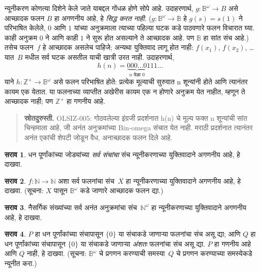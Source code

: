 \documentclass[11pt,a4paper,openany]{book}
\theoremstyle{definition}
\newtheorem{prob}{सराव}[chapter]
\newenvironment{explain}{}{}
\newcommand{\Nat}{\mathbb{N}}
\newcommand{\PosInt}{\mathbb{Z}^{+}}
\newcommand{\Bin}{\mathbb{B}}
\begin{document}
\begin{explain}
न्यूनीकरण कोणत्या दिशेने केले जाते याबद्दल गोंधळ होणे सोपे आहे.
उदाहरणार्थ, $g \colon \Bin^\omega \to B$ असे आच्छादक फलन
$B$ हा अगणनीय आहे, हे \emph{सिद्ध करत नाही}. ($g
\colon \Bin^\omega \to \Bin$ हे $g(s) = s(1)$ ने परिभाषित केलेले,
$0$ आणि $1$ यांच्या अनुक्रमाला त्याच्या पहिल्या घटक कडे
पाठवणारे फलन विचारात घ्या. काही अनुक्रम $0$ ने आणि काही $1$ ने सुरू
होत असल्याने ते आच्छादक आहे. पण $\Bin$ हा सांत संच आहे.)
तसेच फलन~$f$ हे आच्छादक असलेच पाहिजे; अन्यथा युक्तिवाद लागू
होत नाही: $f(x_1)$, $f(x_2)$, \dots{} यात~$B$ मधील सर्व घटक
असतील याची खात्री उरत नाही. उदाहरणार्थ,
\[
h(n) = \underbrace{000\dots0}_{\text{$n$ वेळा $0$}}111\dots
\]
याने $h\colon \PosInt \to
\Bin^\omega$ असे फलन परिभाषित होते: प्रत्येक मूल्याची सुरुवात n शून्यांनी
होते आणि त्यानंतर कायम एक येतात. या फलनाच्या व्याप्तीत अखेरीस कायम एक
न होणारे अनुक्रम येत नाहीत, म्हणून ते आच्छादक नाही; पण $\PosInt$ हा
गणनीय आहे.
\begin{quote}\small\textbf{स्रोतदुरुस्ती.} OLSIZ-005: गोठवलेल्या इंग्रजी प्रदर्शनात h(n) चे मूल्य फक्त n शून्यांची सांत चिन्हमाला आहे, जी अनंत अनुक्रमांच्या Bin-omega संचात येत नाही. मराठी प्रदर्शनात त्यानंतर अनंत एकांची शेपटी जोडून वैध, अनाच्छादक फलन दिले आहे.\end{quote}
\end{explain}

\begin{prob}
धन पूर्णांकांच्या जोड्यांच्या \emph{सर्व संचांचा} संच न्यूनीकरणाच्या
युक्तिवादाने अगणनीय आहे, हे दाखवा.
\end{prob}

\begin{prob}\label{sfr:siz:red:prob:nat-nat}
  $f\colon \Nat \to \Nat$ अशा सर्व फलनांचा संच~$X$ हा न्यूनीकरणाच्या
  युक्तिवादाने अगणनीय आहे, हे दाखवा. (सूचना: $X$ पासून
  $\Bin^\omega$ कडे जाणारे आच्छादक फलन द्या.)
\end{prob}

\begin{prob}
नैसर्गिक संख्यांच्या सर्व अनंत अनुक्रमांचा संच~$\Nat^\omega$ हा
न्यूनीकरणाच्या युक्तिवादाने अगणनीय आहे, हे दाखवा.
\end{prob}

\begin{prob}
$P$ हा धन पूर्णांकांच्या संचापासून $\{0\}$ या संचाकडे जाणाऱ्या फलनांचा
संच असू द्या; आणि $Q$ हा धन पूर्णांकांच्या संचापासून $\{0\}$ या
संचाकडे जाणाऱ्या \emph{अंशतः} फलनांचा संच असू द्या. $P$ हा
गणनीय आहे आणि $Q$ नाही, हे दाखवा. (सूचना: $\Bin^\omega$ चे
प्रगणन करण्याची समस्या~$Q$ चे प्रगणन करण्याच्या समस्येकडे न्यूनीत करा.)
\end{prob}
\end{document}
